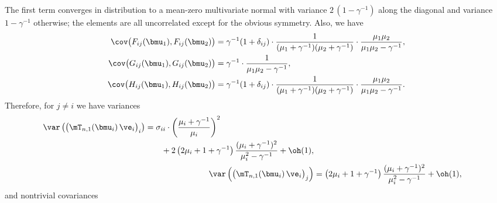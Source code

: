 The first term converges in distribution to a mean-zero multivariate normal
with variance $2 \, (1 - \gamma^{-1})$ along the diagonal and variance $1 - \gamma^{-1}$ otherwise; the elements
are all uncorrelated except for the obvious symmetry.  Also, we have
\begin{align*}
    \cov\big( F_{ij} ( \bmu_1 ), F_{ij} ( \bmu_2 ) \big)
        &= 
        \gamma^{-1} ( 1 + \delta_{ij} )
        \cdot
        \frac{1}{ ( \mu_1 + \gamma^{-1} ) ( \mu_2 + \gamma^{-1} ) }
        \cdot
        \frac{ \mu_1 \mu_2 }{ \mu_1 \mu_2 - \gamma^{-1} }, \\
    \cov\big( G_{ij} ( \bmu_1 ), G_{ij} ( \bmu_2 ) \big)
        &= 
        \gamma^{-1} 
        \cdot
        \frac{1}{ \mu_1 \mu_2 - \gamma^{-1} }, \\
    \cov\big( H_{ij} ( \bmu_1 ), H_{ij} ( \bmu_2 ) \big)
        &= 
        \gamma^{-1} ( 1 + \delta_{ij} )
        \cdot
        \frac{1}{ ( \mu_1 + \gamma^{-1} ) ( \mu_2 + \gamma^{-1} ) }
        \cdot
        \frac{ \mu_1 \mu_2 }{ \mu_1 \mu_2 - \gamma^{-1} }.
\end{align*}
Therefore, for $j \neq i$ we have variances
\begin{subequations}
\begin{align}
    \begin{split}
    \var \left(
        \big(
            \mT_{n,1}( \bmu_i ) \,
            \ve_i
        \big)_i
    \right)
        &= 
        \sigma_{ii}
        \cdot
        \left(
            \frac{\mu_i + \gamma^{-1}}{\mu_i}
        \right)^2 \\
        &\qquad+
        2
        \left(
            2 \mu_i + 1 + \gamma^{-1}
        \right)
        \frac{ (\mu_i + \gamma^{-1})^2 }
             { \mu_i^2 - \gamma^{-1} } + \oh(1), 
    \end{split} \\
    \var \left(
        \big(
            \mT_{n,1}( \bmu_i ) \,
            \ve_i
        \big)_j
    \right)
        &=
        \left(
            2 \mu_i + 1 + \gamma^{-1}
        \right)
        \frac{ (\mu_i + \gamma^{-1})^2 }
             { \mu_i^2 - \gamma^{-1} } + \oh(1),
\end{align}
\end{subequations}
and nontrivial covariances
